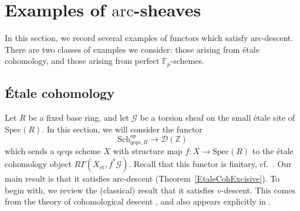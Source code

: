 \documentclass[reqno]{amsart}
\newcommand{\et}{\mathrm{\acute{e}t}}
\newcommand{\arc}{\mathrm{arc}}
\newcommand{\D}{\mathcal{D}}
\theoremstyle{definition}
\begin{document}
\newpage
\section{Examples of $\arc$-sheaves}

In this section, we record several examples of functors which satisfy
$\arc$-descent. There are two classes of examples we consider: those arising
from \'etale cohomology, and those arising from perfect $\mathbb{F}_p$-schemes. 
\label{Etalesec}

\subsection{\'Etale cohomology}
\label{ss:EtaleCohArcSheaf}
Let $R$ be a fixed base ring, and let $\mathcal{G}$ be a torsion sheaf on 
the small \'etale site of $\mathrm{Spec}(R)$. 
In this section, we will consider the functor
\[ \mathrm{Sch}_{qcqs,R}^{op} \to \D( \mathbb{Z})  \]
which sends a qcqs scheme $X$
with structure map $f\colon  X \to \mathrm{Spec}(R)$ to the \'etale cohomology
object $R \Gamma(X_{\et}, f^*\mathcal{G})$. 
Recall that this functor is finitary,  cf.~\cite[Tag 03Q4]{stacks-project}. 
Our main result is that it satisfies $\arc$-descent
(Theorem~\ref{EtaleCohExcisive}). To begin with, we review the (classical)
result that it satisfies $v$-descent.  This comes from the theory of
cohomological descent \cite[Exp.~V-bis]{SGA4}, and also appears explicitly in
\cite[Prop. 5.3.3]{CD}. 
\end{document}
